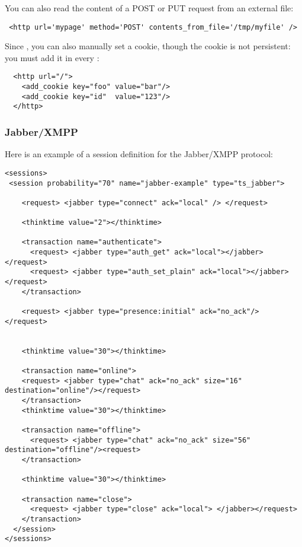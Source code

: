 \documentclass{TSUNG-en}
\begin{document}
 You can also read the content of a POST or PUT
request from an external file:

\begin{Verbatim}
 <http url='mypage' method='POST' contents_from_file='/tmp/myfile' />
\end{Verbatim}

Since , you can also manually set a cookie, though the
cookie is not persistent: you must add it in every :
\begin{Verbatim}
  <http url="/">
    <add_cookie key="foo" value="bar"/>
    <add_cookie key="id"  value="123"/>
  </http>
\end{Verbatim}

\subsubsection{Jabber/XMPP}

\label{sec:sessions:jabber}
\par Here is an example of a session definition for the Jabber/XMPP protocol:
\begin{Verbatim}
<sessions>
 <session probability="70" name="jabber-example" type="ts_jabber">

    <request> <jabber type="connect" ack="local" /> </request>

    <thinktime value="2"></thinktime>

    <transaction name="authenticate">
      <request> <jabber type="auth_get" ack="local"></jabber> </request>
      <request> <jabber type="auth_set_plain" ack="local"></jabber> </request>
    </transaction>

    <request> <jabber type="presence:initial" ack="no_ack"/> </request>


    <thinktime value="30"></thinktime>

    <transaction name="online">
    <request> <jabber type="chat" ack="no_ack" size="16" destination="online"/></request>
    </transaction>
    <thinktime value="30"></thinktime>

    <transaction name="offline">
      <request> <jabber type="chat" ack="no_ack" size="56" destination="offline"/><request>
    </transaction>

    <thinktime value="30"></thinktime>

    <transaction name="close">
      <request> <jabber type="close" ack="local"> </jabber></request>
    </transaction>
  </session>
</sessions>
\end{Verbatim}
\end{document}

